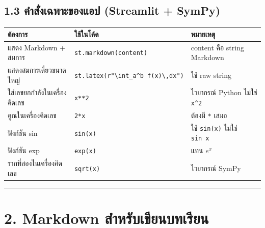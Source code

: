 \documentclass[
  thai,
  12pt,
  letterpaper,
  DIV=11,
  numbers=noendperiod]{scrartcl}
\newcounter{none} %
\begin{document}
\subsection{1.3 คำสั่งเฉพาะของแอป (Streamlit +
SymPy)}\label{uxe04uxe33uxe2auxe07uxe40uxe09uxe1euxe32uxe30uxe02uxe2duxe07uxe41uxe2duxe1b-streamlit-sympy}

{\def\LTcaptype{none} %
\begin{longtable}[]{@{}
  >{\raggedright\arraybackslash}p{}
  >{\raggedright\arraybackslash}p{}
  >{\raggedright\arraybackslash}p{}@{}}
\toprule\noalign{}
\begin{minipage}[b]{\linewidth}\raggedright
ต้องการ
\end{minipage} & \begin{minipage}[b]{\linewidth}\raggedright
ใช้ในโค้ด
\end{minipage} & \begin{minipage}[b]{\linewidth}\raggedright
หมายเหตุ
\end{minipage} \\
\midrule\noalign{}
\endhead
\bottomrule\noalign{}
\endlastfoot
แสดง Markdown + สมการ & \texttt{st.markdown(content)} & content คือ
string Markdown \\
แสดงสมการเดี่ยวขนาดใหญ่ &
\texttt{st.latex(r"\textbackslash{}int\_a\^{}b\ f(x)\textbackslash{},dx")}
& ใช้ raw string \\
ใส่เลขยกกำลังในเครื่องคิดเลข & \texttt{x**2} & ไวยากรณ์ Python ไม่ใช่
\texttt{x\^{}2} \\
คูณในเครื่องคิดเลข & \texttt{2*x} & ต้องมี \texttt{*} เสมอ \\
ฟังก์ชัน sin & \texttt{sin(x)} & ใช้ \texttt{sin(x)} ไม่ใช่ \texttt{sin\ x} \\
ฟังก์ชัน exp & \texttt{exp(x)} & แทน \(e^x\) \\
รากที่สองในเครื่องคิดเลข & \texttt{sqrt(x)} & ไวยากรณ์ SymPy \\
\end{longtable}
}

\begin{center}\rule{0.5\linewidth}{0.5pt}\end{center}

\section{2. Markdown
สำหรับเขียนบทเรียน}\label{markdown-uxe2auxe33uxe2buxe23uxe1auxe40uxe02uxe22uxe19uxe1auxe17uxe40uxe23uxe22uxe19}
\end{document}
